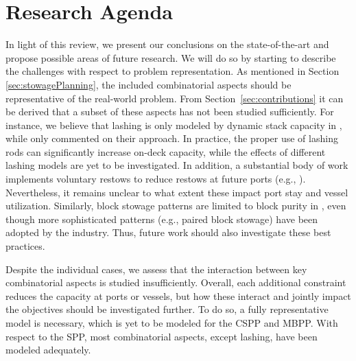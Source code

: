 \documentclass[preprint,12pt,authoryear]{elsarticle}
\begin{document}
\section{Research Agenda}
\label{sec:mathModels}
In light of this review, we present our conclusions on the state-of-the-art and propose possible areas of future research. We will do so by starting to describe the challenges with respect to problem representation.
As mentioned in Section \ref{sec:stowagePlanning}, the included combinatorial aspects should be representative of the real-world problem. From Section~\ref{sec:contributions} it can be derived that a subset of these aspects has not been studied sufficiently. For instance, we believe that lashing is only modeled by dynamic stack capacity in \cite{ElYaagoubi2022Multi-objectiveSystem}, while \cite{Shields1984} only commented on their approach. In practice, the proper use of lashing rods can significantly increase on-deck capacity, while the effects of different lashing models are yet to be investigated. In addition, a substantial body of work implements voluntary restows to reduce restows at future ports (e.g., \cite{Botter1992StowageSolution, Avriel1998StowageShifts, Roberti2018APlans}). Nevertheless, it remains unclear to what extent these impact port stay and vessel utilization. Similarly, block stowage patterns are limited to block purity in \cite{Wilson2000ContainerSolutions, Liu2011RandomizedPlans, Pacino2018CranePlanning, Larsen2021AProblem}, even though more sophisticated patterns (e.g., paired block stowage) have been adopted by the industry. Thus, future work should also investigate these best practices.

Despite the individual cases, we assess that the interaction between key combinatorial aspects is studied insufficiently. Overall, each additional constraint reduces the capacity at ports or vessels, but how these interact and jointly impact the objectives should be investigated further. To do so, a fully representative model is necessary, which is yet to be modeled for the CSPP and MBPP. With respect to the SPP, most combinatorial aspects, except lashing, have been modeled adequately.
\end{document}

